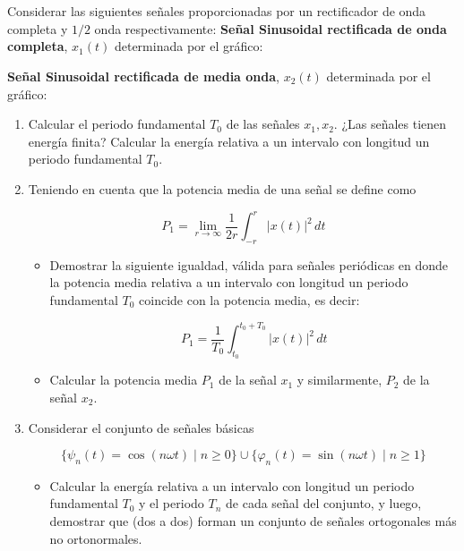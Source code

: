 \documentclass[12pt,a4paper]{report}
\begin{document}
\chapter{}%
Considerar las siguientes señales proporcionadas por un rectificador de onda completa y $1/2$ onda respectivamente:
\textbf{Señal Sinusoidal rectificada de onda completa}, $x_1(t)$ determinada por el gráfico:


\textbf{Señal Sinusoidal rectificada de media onda}, $x_2(t)$ determinada por el gráfico:


\begin{enumerate}[label=\alph*)]
  \item Calcular el periodo fundamental $T_0$ de las señales $x_1, x_2$. ¿Las señales tienen energía finita? Calcular
    la energía relativa a un intervalo con longitud un periodo fundamental $T_0$.

  \item Teniendo en cuenta que la potencia media de una señal se define como

  $$P_1 = \lim_{r \to \infty} \frac{1}{2r} \int_{-r}^{r} |x(t)|^2 \, dt$$

  \begin{itemize}
    \item Demostrar la siguiente igualdad, válida para señales periódicas en donde la potencia media relativa a un
      intervalo con longitud un periodo fundamental $T_0$ coincide con la potencia media, es decir:

     $$P_1 = \frac{1}{T_0} \int_{t_0}^{t_0 + T_0} |x(t)|^2 \, dt$$

    \item Calcular la potencia media $P_1$ de la señal $x_1$ y similarmente, $P_2$ de la señal $x_2$.

  \end{itemize}

  \item Considerar el conjunto de señales básicas

  $$\{\psi_n(t) = \cos(n\omega t) \mid n \geq 0\} \cup \{\varphi_n(t) = \sin(n\omega t) \mid n \geq 1\}$$

  \begin{itemize}
    \item Calcular la energía relativa a un intervalo con longitud un periodo fundamental $T_0$ y el periodo $T_n$
      de cada señal del conjunto, y luego, demostrar que (dos a dos) forman un conjunto de señales ortogonales más no
      ortonormales.


\end{itemize}
\end{enumerate}
\end{document}
